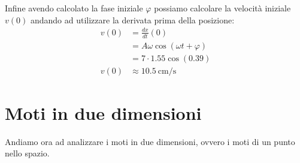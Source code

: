        Infine avendo calcolato la fase iniziale $\varphi$ possiamo calcolare la velocità iniziale $v(0)$ andando ad utilizzare la derivata prima della posizione:
        $$
            \begin{aligned}
                v(0) &= \frac{dx}{dt}(0)\\
                &= A\omega\cos(\omega t + \varphi)\\
                &= 7\cdot1.55\cos(0.39)\\
                v(0) &\approx 10.5\ \text{cm/s}
            \end{aligned}
        $$
\section{Moti in due dimensioni}
    Andiamo ora ad analizzare i moti in due dimensioni, ovvero i moti di un punto nello spazio.

